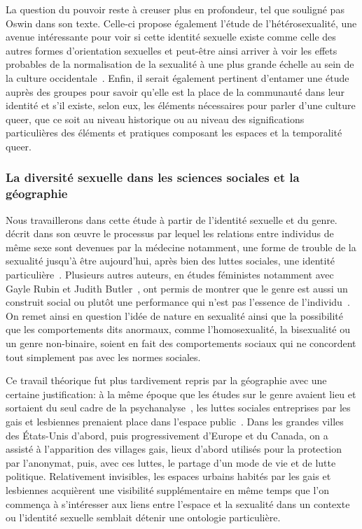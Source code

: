 La question du pouvoir reste à creuser plus en profondeur, tel que souligné pas Oswin dans son texte. 
Celle-ci propose également l'étude de l'hétérosexualité, une avenue intéressante pour voir si cette identité sexuelle existe comme celle des autres formes d'orientation sexuelles et peut-être ainsi arriver à voir les effets probables de la normalisation de la sexualité à une plus grande échelle au sein de la culture occidentale~\citep[100]{Oswin2008}. 
Enfin, il serait également pertinent d’entamer une étude auprès des groupes \lgbt{} pour savoir qu'elle est la place de la communauté dans leur identité et s'il existe, selon eux, les éléments nécessaires pour parler d'une culture queer, que ce soit au niveau historique ou au niveau des significations particulières des éléments et pratiques composant les espaces et la temporalité queer.


\subsubsection{La diversité sexuelle dans les sciences sociales et la
géographie}
\label{ssub:la_diversit_sexuelle_dans_les_sciences_sociales_et_la_g_ographie}
Nous travaillerons dans cette étude à partir de l'identité sexuelle et du genre.
\citet{Foucault2011} décrit dans son œuvre  le processus par lequel les relations entre individus de même sexe sont devenues par la médecine notamment, une forme de trouble de la sexualité jusqu'à être aujourd'hui, après bien des luttes sociales, une identité particulière~\citep{Foucault2011}. 
Plusieurs autres auteurs, en études féministes notamment avec Gayle Rubin et Judith Butler~\citep[98]{Marcus2005}, ont permis de montrer que le genre est aussi un construit social ou plutôt une performance qui n'est pas l'essence de l'individu~\citep{Butler2007}. 
On remet ainsi en question l'idée de nature en sexualité ainsi que la possibilité que les comportements dits anormaux, comme l'homosexualité, la bisexualité ou un genre non-binaire, soient en fait des comportements sociaux qui ne concordent tout simplement pas avec les normes sociales.

Ce travail théorique fut plus tardivement repris par la géographie avec une certaine justification: à la même époque que les études sur le genre avaient lieu et sortaient du seul cadre de la psychanalyse~\citep{Rubin2011a,Rubin2011}, les luttes sociales entreprises par les gais et lesbiennes prenaient place dans l'espace public~\citep[422-427]{Spencer2005}. 
Dans les grandes villes des États-Unis d'abord, puis progressivement d'Europe et du Canada, on a assisté à l'apparition des villages gais, lieux d'abord utilisés pour la protection par l'anonymat, puis, avec ces luttes, le partage d'un mode de vie et de lutte politique. 
Relativement invisibles, les espaces urbains habités par les gais et lesbiennes acquièrent une visibilité supplémentaire en même temps que l'on commença à s'intéresser aux liens entre l'espace et la sexualité dans un contexte ou l'identité sexuelle semblait détenir une ontologie particulière.

